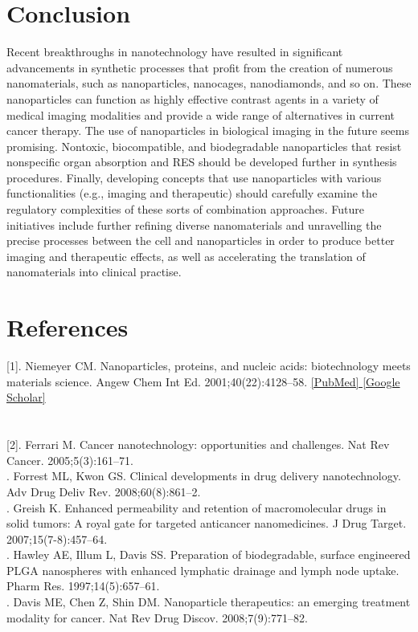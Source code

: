 \documentclass[12pt]{article}
\begin{document}
\section*{Conclusion}
Recent breakthroughs in nanotechnology have resulted in significant advancements in synthetic processes that profit from the creation of numerous nanomaterials, such as nanoparticles, nanocages, nanodiamonds, and so on. These nanoparticles can function as highly effective contrast agents in a variety of medical imaging modalities and provide a wide range of alternatives in current cancer therapy. The use of nanoparticles in biological imaging in the future seems promising. Nontoxic, biocompatible, and biodegradable nanoparticles that resist nonspecific organ absorption and RES should be developed further in synthesis procedures. Finally, developing concepts that use nanoparticles with various functionalities (e.g., imaging and therapeutic) should carefully examine the regulatory complexities of these sorts of combination approaches.
Future initiatives include further refining diverse nanomaterials and unravelling the precise processes between the cell and nanoparticles in order to produce better imaging and therapeutic effects, as well as accelerating the translation of nanomaterials into clinical practise.

\section*{References}
[1]. Niemeyer CM. Nanoparticles, proteins, and nucleic acids: biotechnology meets materials science. Angew Chem Int Ed. 2001;40(22):4128–58. \url{[PubMed] [Google Scholar]}
\section*{}
[2]. Ferrari M. Cancer nanotechnology: opportunities and challenges. Nat Rev Cancer. 2005;5(3):161–71. \\[3]. Forrest ML, Kwon GS. Clinical developments in drug delivery nanotechnology. Adv Drug Deliv Rev. 2008;60(8):861–2. \\
[4]. Greish K. Enhanced permeability and retention of macromolecular drugs in solid tumors: A royal gate for targeted anticancer nanomedicines. J Drug Target. 2007;15(7-8):457–64. \\
[5]. Hawley AE, Illum L, Davis SS. Preparation of biodegradable, surface engineered PLGA nanospheres with enhanced lymphatic drainage and lymph node uptake. Pharm Res. 1997;14(5):657–61. \\
[6]. Davis ME, Chen Z, Shin DM. Nanoparticle therapeutics: an emerging treatment modality for cancer. Nat Rev Drug Discov. 2008;7(9):771–82. 



 
\end{document}
